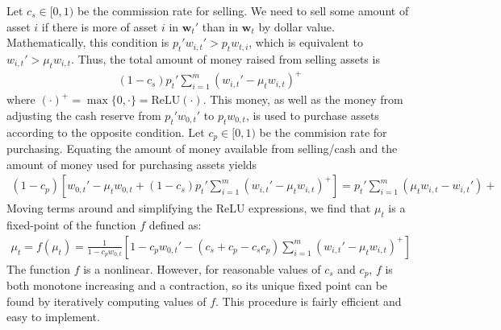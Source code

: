 Let $c_s \in [0, 1)$ be the commission rate for selling. We need to sell some amount of asset $i$ if 
there is more of asset $i$ in $\mathbf w_t'$ than in $\mathbf w_t$ by dollar value. Mathematically, this condition
is $p_t' w_{i,t}' > p_t w_{t,i}$, which is equivalent to $w_{i,t}' > \mu_t w_{i,t}$. Thus, the total amount of
money raised from selling assets is
\begin{align*}
  (1-c_s) p_t' \sum_{i=1}^m (w_{i,t}' - \mu_t w_{i,t})^+
\end{align*}
where $(\cdot)^+ = \max\{0, \cdot\} = \mathrm{ReLU}(\cdot)$. This money, as well as the money from adjusting the cash reserve
from $p_t' w_{0,t}'$ to $p_t w_{0,t}$, is used to purchase assets according to the opposite condition.
Let $c_p \in [0, 1)$ be the commision rate for purchasing. Equating the amount of money available from selling/cash and the amount of money
used for purchasing assets yields
\begin{align*}
  (1-c_p)\left[ w_{0,t}' - \mu_t w_{0,t} + (1-c_s) p_t' \sum_{i=1}^m (w_{i,t}' - \mu_t w_{i,t})^+ \right] = p_t'\sum_{i=1}^m (\mu_t w_{i,t} - w_{i,t}')+
\end{align*}
Moving terms around and simplifying the ReLU expressions, we find that $\mu_t$ is a fixed-point of the function $f$ defined as:
\begin{align*}
  \mu_t = f(\mu_t) = \frac{1}{1 - c_p w_{0,t}}\left[ 1 - c_p w_{0,t}' - (c_s + c_p - c_s c_p) \sum_{i=1}^m (w_{i,t}' - \mu_t w_{i,t})^+ \right]
\end{align*}
The function $f$ is a nonlinear. However, for reasonable values of $c_s$ and $c_p$, $f$ is both monotone increasing and a contraction, so its unique fixed point
can be found by iteratively computing values of $f$. This procedure is fairly efficient and easy to implement.